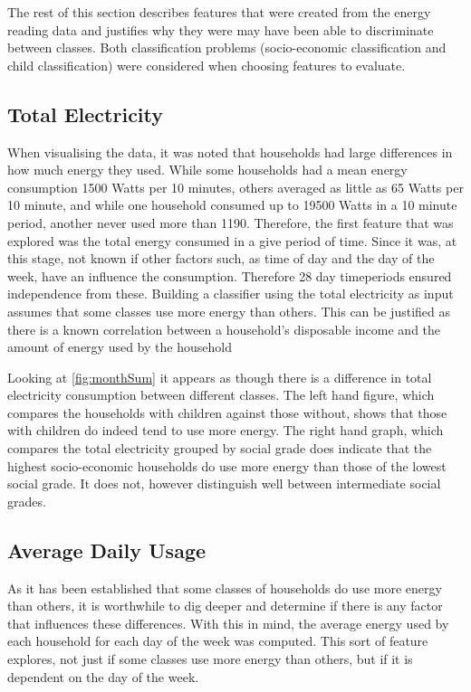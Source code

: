 The rest of this section describes features that were created from the energy reading data and justifies why they were may have been able to discriminate between classes. Both classification problems (socio-economic classification and child classification) were considered when choosing features to evaluate.

\subsection{Total Electricity}
When visualising the data, it was noted that households had large differences in how much energy they used. While some households had a mean energy consumption 1500 Watts per 10 minutes, others averaged as little as 65 Watts per 10 minute, and while one household consumed up to 19500 Watts in a 10 minute period, another never used more than 1190. Therefore, the first feature that was explored was the total energy consumed in a give period of time. Since it was, at this stage, not known if other factors such, as time of day and the day of the week, have an influence the consumption. Therefore 28 day timeperiods ensured independence from these.
Building a classifier using the total electricity as input assumes that some classes use more energy than others. This can be justified as there is a known correlation between a household's disposable income and the amount of energy used by the household \cite{Gomez}

\monthSum

Looking at \ref{fig:monthSum} it appears as though there is a difference in total electricity consumption between different classes. The left hand figure, which compares the households with children against those without, shows that those with children do indeed tend to use more energy. The right hand graph, which compares the total electricity grouped by social grade does indicate that the highest socio-economic households do use more energy than those of the lowest social grade. It does not, however distinguish well between intermediate social grades.

\subsection*{Average Daily Usage}
As it has been established that some classes of households do use more energy than others, it is worthwhile to dig deeper and determine if there is any factor that influences these differences. With this in mind, the average energy used by each household for each day of the week was computed. This sort of feature explores, not just if some classes use more energy than others, but if it is dependent on the day of the week. 

